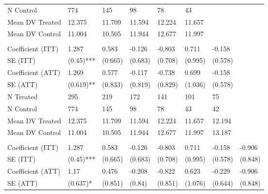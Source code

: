 \begin{table}[!h]
\begin{threeparttable}
\begin{tabular}[t]{llllllll}
\hspace{1em}N Control & 774 & 145 & 98 & 78 & 43 &  & \\
\hspace{1em}Mean DV Treated & 12.375 & 11.709 & 11.594 & 12.224 & 11.657 &  & \\
\hspace{1em}Mean DV Control & 11.004 & 10.505 & 11.944 & 12.677 & 11.997 &  & \\
\addlinespace[0.3em]
\multicolumn{8}{l}{\textbf{Panel C: t* = 6}}\\
\hspace{1em}Coefficient (ITT) & 1.287 & 0.583 & -0.126 & -0.803 & 0.711 & -0.158 & \\
\hspace{1em}SE (ITT) & (0.45)*** & (0.665) & (0.683) & (0.708) & (0.995) & (0.578) & \\
\hspace{1em}Coefficient (ATT) & 1.269 & 0.577 & -0.117 & -0.738 & 0.699 & -0.158 & \\
\hspace{1em}SE (ATT) & (0.619)** & (0.833) & (0.819) & (0.829) & (1.036) & (0.578) & \\
\hspace{1em}N Treated & 295 & 219 & 172 & 141 & 101 & 75 & \\
\hspace{1em}N Control & 774 & 145 & 98 & 78 & 43 & 42 & \\
\hspace{1em}Mean DV Treated & 12.375 & 11.709 & 11.594 & 12.224 & 11.657 & 12.194 & \\
\hspace{1em}Mean DV Control & 11.004 & 10.505 & 11.944 & 12.677 & 11.997 & 13.187 & \\
\addlinespace[0.3em]
\multicolumn{8}{l}{\textbf{Panel D: t* = 7}}\\
\hspace{1em}Coefficient (ITT) & 1.287 & 0.583 & -0.126 & -0.803 & 0.711 & -0.158 & -0.906\\
\hspace{1em}SE (ITT) & (0.45)*** & (0.665) & (0.683) & (0.708) & (0.995) & (0.578) & (0.848)\\
\hspace{1em}Coefficient (ATT) & 1.17 & 0.476 & -0.208 & -0.822 & 0.623 & -0.229 & -0.906\\
\hspace{1em}SE (ATT) & (0.637)* & (0.851) & (0.84) & (0.851) & (1.076) & (0.644) & (0.848)\\

\end{tabular}
\end{threeparttable}
\end{table}
